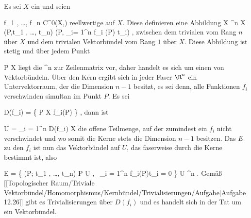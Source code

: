 {}
{

Es sei $X$ ein
und seien

\mavergleichskette
{\vergleichskette
{ f_1 , \ldots , f_n
}
{ \in }{ C^0(X,\R)
}
{  }{
}
{    }{
}
{   }{
}
}
{}{}{}
reellwertige
auf $X$. Diese definieren eine Abbildung
\maabbeledisp {} {X \times \R^n } { X \times \R
} {(P,t_1 , \ldots , t_n) } { (P, \sum_{i= 1}^n f_i (P) t_i)
} {,}
zwischen dem trivialen
vom Rang $n$ über $X$ und dem trivialen Vektorbündel vom Rang $1$ über $X$. Diese Abbildung ist stetig und über jedem Punkt

\mavergleichskette
{\vergleichskette
{ P
}
{ \in }{ X
}
{  }{
}
{    }{
}
{   }{
}
}
{}{}{}
liegt die
\maabb {} {\R^n } { \R
} {}
zur Zeilenmatrix
 vor, daher handelt es sich um einen
von Vektorbündeln. Über den Kern ergibt sich in jeder Faser $\R^n$ ein Untervektorraum, der die Dimension $n-1$ besitzt, es sei denn, alle Funktionen $f_i$ verschwinden simultan im Punkt $P$. Es sei

\mavergleichskette
{\vergleichskette
{ D(f_i)
}
{ = }{ \left\{ P \in X  \mid  f_i(P)         \right\}
}
{  }{
}
{    }{
}
{   }{
}
}
{}{}{,}
dann ist

\mavergleichskette
{\vergleichskette
{ U
}
{ = }{ \bigcup_{i = 1}^n D(f_i)
}
{ \subseteq }{ X
}
{    }{
}
{   }{
}
}
{}{}{}
die offene Teilmenge, auf der zumindest ein $f_i$ nicht verschwindet und wo somit die Kerne stets die Dimension $n-1$ besitzen. Das  {}  $E$ zu den $f_i$ ist nun das Vektorbündel auf $U$, das faserweise durch die Kerne bestimmt ist, also

\mavergleichskettedisp
{\vergleichskette
{ E
}
{ =} { \left\{  (P; t_1 , \ldots , t_n)  \mid   P \in U , \,  \sum_{i = 1}^n f_i(P)t_i = 0       \right\}
}
{ \subseteq} { U \times \R^n
}
{ } {
}
{ } {
}
}
{}{}{.}
Gemäß
[[Topologischer Raum/Triviale Vektorbündel/Homomorphismus/Kernbündel/Trivialisierungen/Aufgabe|Aufgabe 12.26]]
gibt es Trivialisierungen über $D(f_i)$ und es handelt sich in der Tat um ein Vektorbündel.

}

